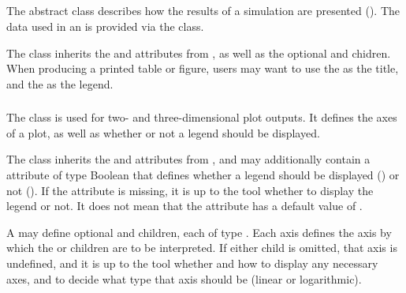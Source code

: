 \subsection{}
\label{class:output}

The abstract \Output class describes how the results of a simulation are presented ().  The data used in an \Output is provided via the \DataGenerator class.


\begin{blockChanged}
The \Output class inherits the  and  attributes from \SedBase, as well as the optional  and  chidren.  When producing a printed table or figure, users may want to use the  as the title, and the  as the legend.
\end{blockChanged}

\begin{blockChanged}
\subsubsection{}
\label{class:plot}
The \Plot class is used for two- and three-dimensional plot outputs.  It defines the axes of a plot, as well as whether or not a legend should be displayed.


The \Plot class inherits the  and  attributes from \SedBase, and may additionally contain a  attribute of type Boolean that defines whether a legend should be displayed () or not ().  If the attribute is missing, it is up to the tool whether to display the legend or not.  It does not mean that the attribute has a default value of .

A \Plot may define optional  and  children, each of type \Axis.  Each axis defines the axis by which the \Curve or \Surface children are to be interpreted.  If either child is omitted, that axis is undefined, and it is up to the tool whether and how to display any necessary axes, and to decide what type that axis should be (linear or logarithmic).

\end{blockChanged}

